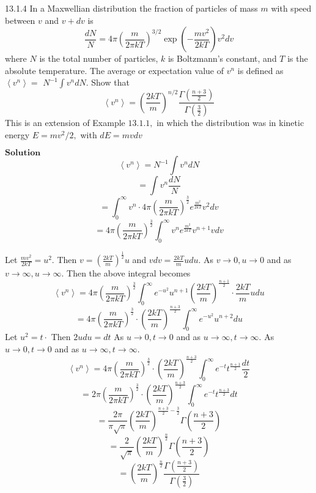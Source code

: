 \documentclass{styles/kaobook}
\begin{document}
\begin{greenbox}{13.1.4}
In a Maxwellian distribution the fraction of particles of mass $m$ with speed between $v$ and $v+d v$ is
$$
\frac{d N}{N}=4 \pi\left(\frac{m}{2 \pi k T}\right)^{3 / 2} \exp \left(-\frac{m v^{2}}{2 k T}\right) v^{2} d v
$$
where $N$ is the total number of particles, $k$ is Boltzmann's constant, and $T$ is the absolute temperature. The average or expectation value of $v^{n}$ is defined as $\left\langle v^{n}\right\rangle=$ $N^{-1} \int v^{n} d N .$ Show that
$$
\left\langle v^{n}\right\rangle=\left(\frac{2 k T}{m}\right)^{n / 2} \frac{\Gamma\left(\frac{n+3}{2}\right)}{\Gamma\left(\frac{3}{2}\right)}
$$
This is an extension of Example $13.1 .1,$ in which the distribution was in kinetic energy $E=m v^{2} / 2,$ with $d E=m v d v$
\end{greenbox}
$\boxed{\textbf{Solution}}$ 
$$\left\langle v^{n}\right\rangle=N^{-1} \int v^{n} d N$$
$$=\int v^{n} \frac{d N}{N}$$
$$=\int_{0}^{\infty} v^{n} \cdot 4 \pi\left(\frac{m}{2 \pi k T}\right)^{\frac{3}{2}} e^{\frac{m^{2}}{2 k T}} v^{2} d v$$
$$=4 \pi\left(\frac{m}{2 \pi k T}\right)^{\frac{3}{2}} \int_{0}^{\infty} v^{n} e^{\frac{m^{2}}{2 k T}} v^{n+1} v d v$$

Let $\frac{m v^{2}}{2 k T}=u^{2} .$ Then $v=\left(\frac{2 k T}{m}\right)^{\frac{1}{2}} u$ and $v d v=\frac{2 k T}{m} u d u$. As $v \rightarrow 0, u \rightarrow 0$ and as $v \rightarrow \infty, u \rightarrow \infty$. Then the above integral becomes
$$
\left\langle v^{n}\right\rangle=4 \pi\left(\frac{m}{2 \pi k T}\right)^{\frac{3}{2}} \int_{0}^{\infty} e^{-u^{2}} u^{n+1}\left(\frac{2 k T}{m}\right)^{\frac{n+1}{2}} \cdot \frac{2 k T}{m} u d u
$$
$$
=4 \pi\left(\frac{m}{2 \pi k T}\right)^{\frac{3}{2}} \cdot\left(\frac{2 k T}{m}\right)^{\frac{n+3}{2}} \int_{0}^{\infty} e^{-u^{2}} u^{n+2} d u
$$
Let $u^{2}=t \cdot$ Then $2 u d u=d t$ As $u \rightarrow 0, t \rightarrow 0$ and as $u \rightarrow \infty, t \rightarrow \infty$. As $u \rightarrow 0, t \rightarrow 0$ and as $u \rightarrow \infty, t \rightarrow \infty$.
$$
\left\langle v^{n}\right\rangle=4 \pi\left(\frac{m}{2 \pi k T}\right)^{\frac{3}{2}} \cdot\left(\frac{2 k T}{m}\right)^{\frac{n+3}{2}} \int_{0}^{\infty} e^{-t} t^{\frac{n+1}{2}} \frac{d t}{2}
$$
$$
=2 \pi\left(\frac{m}{2 \pi k T}\right)^{\frac{3}{2}} \cdot\left(\frac{2 k T}{m}\right)^{\frac{n+3}{2}} \int_{0}^{\infty} e^{-t} t^{\frac{n+3}{2}} d t
$$
$$
=\frac{2 \pi}{\pi \sqrt{\pi}}\left(\frac{2 k T}{m}\right)^{\frac{n+3}{2}-\frac{3}{2}} \Gamma\left(\frac{n+3}{2}\right)
$$
$$
=\frac{2}{\sqrt{\pi}}\left(\frac{2 k T}{m}\right)^{\frac{n}{2}} \Gamma\left(\frac{n+3}{2}\right)
$$
$$
=\left(\frac{2 k T}{m}\right)^{\frac{n}{2}} \frac{\Gamma\left(\frac{n+3}{2}\right)}{\Gamma\left(\frac{3}{2}\right)}
$$
\end{document}
